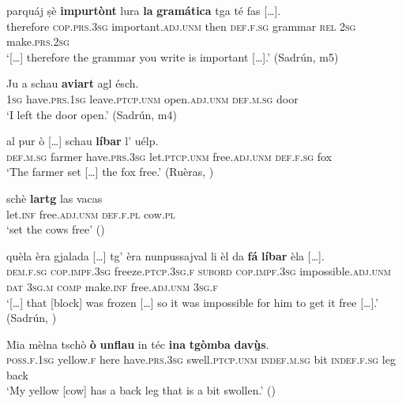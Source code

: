 \ea\label{ex:noagr:1}
\gll   [...] parquáj ṣè \textbf{impurtònt} lura \textbf{la} \textbf{gramática} tga té fas […]. \\
     {} therefore \textsc{cop.prs.3sg} important.\textsc{adj.unm} then \textsc{def.f.sg} grammar \textsc{rel} \textsc{2sg} make.\textsc{prs.2sg}\\
\glt `[…] therefore the grammar you write is important […].' (Sadrún, m5)
\z

\ea\label{ex:noagr:2}
\gll Ju a schau \textbf{aviart} agl ésch.   \\
 \textsc{1sg} have.\textsc{prs.1sg} leave.\textsc{ptcp.unm} open.\textsc{adj.unm} \textsc{def.m.sg} door\\
\glt `I left the door open.' (Sadrún, m4)
\z

\ea\label{ex:noagr:3}
\gll    [...] al pur ò […] schau \textbf{líbar} l’ uélp.\\
     {} \textsc{def.m.sg} farmer have.\textsc{prs.3sg} {} let.\textsc{ptcp.unm} free.\textsc{adj.unm} \textsc{def.f.sg} fox\\
\glt `The farmer set […] the fox free.' (Ruèras, \citealt[64]{Büchli1966})
\z

\ea

\gll schè \textbf{lartg} las vacas\\
let.\textsc{inf} free.\textsc{adj.unm} \textsc{def.f.pl} cow.\textsc{pl}\\
\glt `set the cows free' ()
\z

\ea
\label{ex:noagr:4}
\gll   […] quèla èra gjalada […] tg' èra nunpussajval li èl da \textbf{fá} \textbf{líbar} èla […].\\
      {} \textsc{dem.f.sg} \textsc{cop.impf.3sg} freeze.\textsc{ptcp.3sg.f} {} \textsc{subord} \textsc{cop.impf.3sg} impossible.\textsc{adj.unm} \textsc{dat} \textsc{3sg.m} \textsc{comp} make.\textsc{inf} free.\textsc{adj.unm} \textsc{3sg.f}\\
\glt `[…] that [block] was frozen […] so it was impossible for him to get it free […].' (Sadrún, \citealt[105]{Büchli1966})
\z

\ea\label{ex:noagr:5}
\gll  Mia mèlna tschò \textbf{ò} \textbf{unflau} in téc \textbf{ina} \textbf{tgòmba} \textbf{dav{\`u̱̱}s}.  \\
     \textsc{poss.f.1sg} yellow.\textsc{f} here have.\textsc{prs.3sg} swell.\textsc{ptcp.unm}  \textsc{indef.m.sg} bit \textsc{indef.f.sg} leg back\\
\glt `My yellow [cow] has a back leg that is a bit swollen.' (\citealt[31]{Berther2007})
\z

